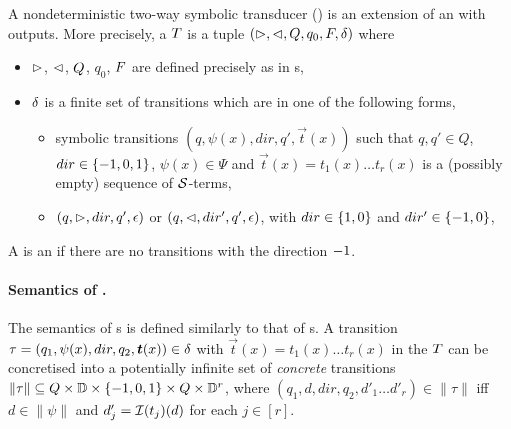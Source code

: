 \begin{definition}
    A nondeterministic two-way symbolic transducer (\SST) is an extension of an \SSA{} with outputs. More precisely, a \SST{} $T$ is a tuple $(\vartriangleright, \vartriangleleft, Q, q_0, F, \delta)$ where  
\begin{itemize}
%
\item $\vartriangleright$, $\vartriangleleft$, $Q$, $q_0$, $F$ are defined precisely as in \SSA{}s, 
%
\item $\delta$ is a finite set of  transitions which are in one of the following forms,
\begin{itemize}
\item  symbolic transitions $(q, \psi(x), dir, q', \vec{t}(x))$ such that $q, q' \in Q$, $dir \in \{-1, 0, 1\}$, $\psi(x) \in \Psi$ and
$\vec{t}(x) = t_1(x) \ldots t_r(x)$ is a (possibly empty) sequence of $\mathcal{S}$-terms, 
\item   $(q, \vartriangleright, dir, q', \epsilon)$ or $(q, \vartriangleleft, dir', q', \epsilon)$, with $dir \in \{1, 0\}$ and $dir' \in \{-1, 0\}$,
\end{itemize}
\end{itemize}
A \SST{} is an \ST{} if there are no transitions with the direction $-1$. 
\end{definition}

\paragraph{Semantics of \SST{}.}
The semantics of \SST{}s is defined similarly to that of \SSA{}s. 
A transition $\tau=(q_1,\psi(x), dir, q_2, \vec{t}(x)) \in \transrel$ with $\vec{t}(x) = t_1(x) \ldots t_r(x)$ in the \SST{} $T$ can be concretised
into a potentially infinite set of \emph{concrete} transitions $\|\tau\| \subseteq Q \times \mathbb{D} \times \{-1, 0, 1\} \times Q \times \mathbb{D}^r$, where $(q_1, d, dir, q_2, d'_1\ldots d'_r)  \in \|\tau\|$ iff $d \in \|\psi\|$ and $d'_j = \mathcal{I}(t_j)(d)$ for each $j \in [r]$.

